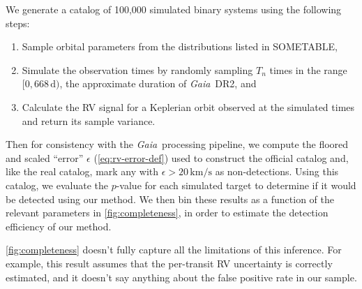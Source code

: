 \documentclass[modern, letterpaper]{aastex631}
\newcommand{\project}[1]{\textsl{#1}}
\newcommand{\Gaia}{\project{Gaia}}
\begin{document}
We generate a catalog of 100,000 simulated binary systems using the following steps:
\begin{enumerate}
	\item Sample orbital parameters from the distributions listed in SOMETABLE,
	\item Simulate the observation times by randomly sampling $T_n$ times in the range $[0, 668\,\mathrm{d})$, the approximate duration of \Gaia\ DR2, and
	\item Calculate the RV signal for a Keplerian orbit observed at the simulated times and return its sample variance.
\end{enumerate}
Then for consistency with the \Gaia\ processing pipeline, we compute the floored and scaled ``error'' $\epsilon$ (\autoref{eq:rv-error-def}) used to construct the official catalog and, like the real catalog, mark any with $\epsilon > 20\,\mathrm{km/s}$ as non-detections.
Using this catalog, we evaluate the $p$-value for each simulated target to determine if it would be detected using our method.
We then bin these results as a function of the relevant parameters in \autoref{fig:completeness}, in order to estimate the detection efficiency of our method.

\autoref{fig:completeness} doesn't fully capture all the limitations of this inference.
For example, this result assumes that the per-transit RV uncertainty is correctly estimated, and it doesn't say anything about the false positive rate in our sample.


\end{document}
